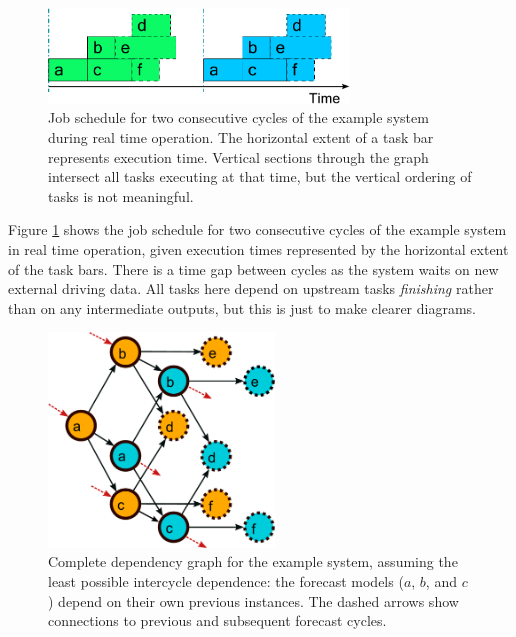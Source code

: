 \documentclass[11pt,a4paper]{article}
\begin{document}
\begin{figure}
    \begin{center}
        \includegraphics[width=8cm]{timeline-one}
    \end{center}
    \caption{\small Job schedule for two consecutive cycles of the
    example system during real time operation. The horizontal extent of
    a task bar represents execution time. Vertical sections through the
    graph intersect all tasks executing at that time, but the vertical
    ordering of tasks is not meaningful.}
    \label{fig-time-one}
\end{figure}

Figure \ref{fig-time-one} shows the job schedule for two consecutive
cycles of the example system in real time operation, given execution
times represented by the horizontal extent of the task bars. There is a
time gap between cycles as the system waits on new external driving
data. 
All tasks here depend on upstream tasks {\em finishing} rather than on
any intermediate outputs, but this is just to make clearer diagrams.

\begin{figure} \begin{center}
    \includegraphics[width=6cm]{dependencies-two} \end{center}
    \caption{\small Complete dependency graph for the example
    system, assuming the least possible intercycle dependence: the
    forecast models ($a$, $b$, and $c$) depend on their own previous
    instances. The dashed arrows show connections to previous and
    subsequent forecast cycles.} 
    \label{fig-dep-two}
\end{figure}
\end{document}
